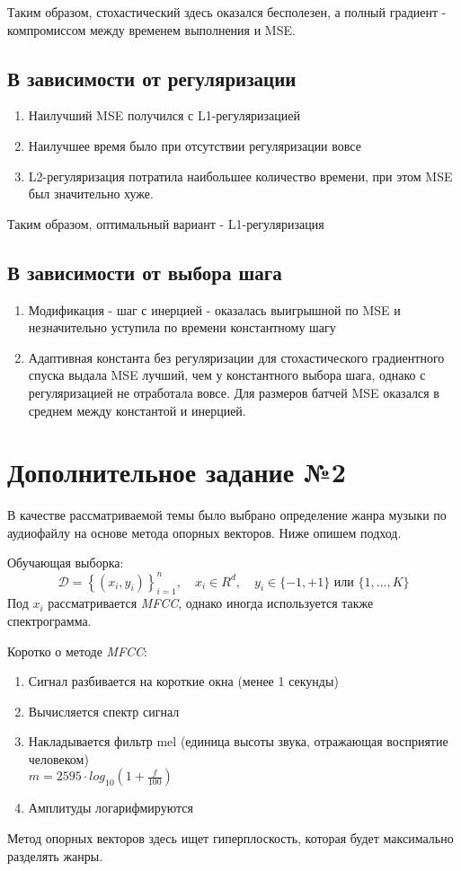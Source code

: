 \documentclass{article}
\begin{document}
Таким образом, стохастический здесь оказался бесполезен, а полный градиент - компромиссом между временем выполнения и MSE.

\subsection{В зависимости от регуляризации}
\begin{enumerate}
    \item 
    Наилучший MSE получился с L1-регуляризацией
    \item 
    Наилучшее время было при отсутствии регуляризации вовсе
    \item
    L2-регуляризация потратила наибольшее количество времени, при этом MSE был значительно хуже.
\end{enumerate}

Таким образом, оптимальный вариант - L1-регуляризация

\subsection{В зависимости от выбора шага}
\begin{enumerate}
    \item 
    Модификация - шаг с инерцией - оказалась выигрышной по MSE и незначительно уступила по времени константному шагу
    \item
    Адаптивная константа без регуляризации для стохастического градиентного спуска выдала MSE лучший, чем у константного выбора шага, однако с регуляризацией не отработала вовсе. Для размеров батчей MSE оказался в среднем между константой и инерцией.
\end{enumerate}

\section{Дополнительное задание №2}
В качестве рассматриваемой темы было выбрано определение жанра музыки по аудиофайлу на основе метода опорных векторов. Ниже опишем подход.

Обучающая выборка: \[
\mathcal{D} = \left\{(x_i, y_i)\right\}_{i=1}^n,\quad x_i \in R^d,\quad y_i \in \{-1, +1\} \text{ или } \{1, \dots, K\}
\]
Под $x_i$ рассматривается \textit{MFCC}, однако иногда используется также спектрограмма.

Коротко о методе \textit{MFCC}:
\begin{enumerate}
    \item 
    Сигнал разбивается на короткие окна (менее 1 секунды)
    \item 
    Вычисляется спектр сигнал
    \item
    Накладывается фильтр mel (единица высоты звука, отражающая восприятие человеком) \\
    $m = 2595 \cdot log_{10}\left(1 + \frac{f}{100}\right)$
    \item 
    Амплитуды логарифмируются
\end{enumerate}

Метод опорных векторов здесь ищет гиперплоскость, которая будет максимально разделять жанры. 
\end{document}
